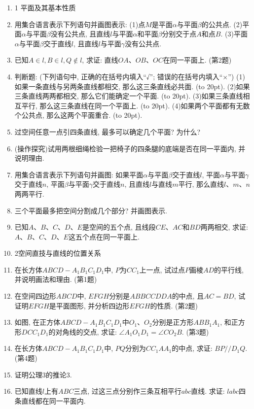 \documentclass[10pt,a4paper]{article}
\newcommand{\bracket}[1]{(\hbox to #1pt{})}
\begin{document}
\begin{enumerate}[1.]

\item 1 平面及其基本性质
\item 用集合语言表示下列语句并画图表示:
(1)点$M$是平面$\alpha$与平面$\beta$的公共点.
(2)平面$\alpha$与平面$\beta$没有公共点, 且直线$l$与平面$\alpha$和平面$\beta$分别交于点$A$和点$B$.
(3)平面$\alpha$与平面$\beta$交于直线$l$, 且直线$l$与平面$\gamma$没有公共点.
\item 已知$A\in l,B\in l,Q\notin l$, 求证: 直线$OA$、$OB$、$OC$在同一平面上.
(第2题)
\item 判断题: (下列语句中, 正确的在括号内填入``√''; 错误的在括号内填入``×'')
(1)如果一条直线与另两条直线都相交, 那么这三条直线必共面. \bracket{20}.
(2)如果三条直线两两都相交, 那么它们能确定一个平面. \bracket{20}.
(3)如果三条直线相互平行, 那么这三条直线在同一个平面上. \bracket{20}.
(4)如果两个平面都有无数个公共点, 那么这两个平面重合.   \bracket{20}.
\item 过空间任意一点引四条直线, 最多可以确定几个平面? 为什么?
\item (操作探究)试用两根细绳检验一把椅子的四条腿的底端是否在同一平面内, 并说明理由.
\item 用集合语言表示下列语句并画图:
如果平面$\alpha$与平面$\beta$交于直线$l$, 平面$\alpha$与平面$\gamma$交于直线$n$, 平面$\beta$与平面$\gamma$交于直线$n$, 且直线$l$与直线$m$平行, 那么直线$l$、$m$、$n$两两平行.
\item 三个平面最多把空间分割成几个部分? 并画图表示.
\item 已知$A$、$B$、$C$、$D$、$E$是空间的五个点, 且线段$CE$、$AC$和$BD$两两相交, 求证: $A$、$B$、$C$、$D$、$E$这五个点在同一平面上.
\item 2空间直技与直线的位置关系
\item 在长方体$ABCD-A_1B_1C_1D_1$中, $P$为$CC_1$上一点, 试过点$P$画棱$AD$的平行线, 并说明画法和理由.
(第1题)
\item 在空间四边形$ABCD$中, $EFGH$分别是$ABBCCDDA$的中点, 且$AC=BD$, 试证明$EFGH$是平面图形, 并分析四边形$EFGH$的性质.
(第2题)
\item 如图, 在正方体$ABCD-A_1B_1C_1D_1$中$O_1$、$O_2$分别是正方形$ABB_1A_1$, 和正方形$DCC_1D_1$的对角线的交点, 求证: $\angle A_1O_1D_1=\angle CO_2B$.
(第3题)
\item 在长方体$ABCD-A_1B_1C_1D_1$中, $PQ$分别为$CC_1AA_1$的中点, 求证: $BP//D_1Q$.
(第4题)
\item 证明公理3的推论3.
\item 已知直线$l$上有$ABC$三点, 过这三点分别作三条互相平行$abc$直线. 求证: $labc$四条直线都在同一平面内.

\end{enumerate}
\end{document}
